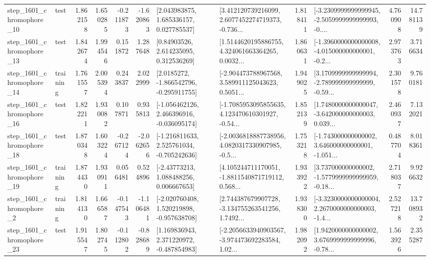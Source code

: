 \begin{tabular}{llrrrrllrlrr}
 step\_1601\_chromophore\_10 &      test &      1.862158 &    1.650285 &     -0.211873 & -1.620863 &     [2.043983875, 1.685336157, 0.027785537] &  [3.412120739216099, 2.6077452274719373, -0.736... &       1.818411 &  [-3.2309999999999945, -2.5059999999999993, -0.... &            4.760908 &         14.781139 \\
 step\_1601\_chromophore\_13 &      test &      1.842674 &    1.994546 &      0.151872 &  1.287648 &      [0.84903526, 2.614235095, 0.312536269] &  [1.5144620195886755, 4.324061663364265, 0.0032... &       1.860631 &  [-1.3960000000000008, -4.015000000000001, -0.2... &            2.973763 &          3.716634 \\
 step\_1601\_chromophore\_14 &  training &      1.761557 &    2.005394 &      0.243837 &  2.022999 &     [2.0185272, -1.866542796, -0.295911755] &  [-2.904473788967568, 3.589911125043623, 0.5051... &       1.949025 &  [3.1709999999999994, -2.789999999999999, -0.59... &            2.301578 &          9.760181 \\
 step\_1601\_chromophore\_16 &      test &      1.822211 &    1.930082 &      0.107871 &  0.935813 &   [-1.056462126, 2.466396916, -0.036095174] &  [-1.7085953095855635, 4.123470610301927, -0.54... &       1.852139 &  [1.7480000000000047, -3.642000000000003, 0.039... &            2.460937 &          7.132021 \\
 step\_1601\_chromophore\_18 &      test &      1.870348 &    1.603224 &     -0.267124 & -2.062656 &   [-1.216811633, 2.525761034, -0.705242636] &  [-2.0036818887738956, 4.0820317330907985, -0.5... &       1.753218 &  [-1.743000000000002, 3.646000000000001, -1.051... &            0.487704 &          8.018361 \\
 step\_1601\_chromophore\_19 &  training &      1.874430 &    1.930911 &      0.056481 &  0.524896 &     [-2.43773213, 1.088488256, 0.006667653] &  [4.105244711170051, -1.8811540871719112, 0.568... &       1.933922 &  [3.737000000000002, -1.5779999999999959, -0.18... &            2.718037 &          9.926632 \\
  step\_1601\_chromophore\_2 &  training &      1.814130 &    1.666587 &     -0.147543 & -1.106481 &   [-2.020760408, 1.520219898, -0.957638708] &  [2.744387679907728, -3.134755263541256, 1.7492... &       1.938300 &  [-3.3230000000000004, 2.2670000000000003, -1.4... &            2.527218 &         13.708932 \\
 step\_1601\_chromophore\_23 &      test &      1.915547 &    1.802745 &     -0.112802 & -0.828689 &    [1.169836943, 2.371220972, -0.487854983] &  [-2.2056633940903567, -3.974473692283584, 1.02... &       1.982092 &  [1.9420000000000002, 3.6769999999999996, -0.78... &            1.563926 &          2.355287 \\

\end{tabular}
